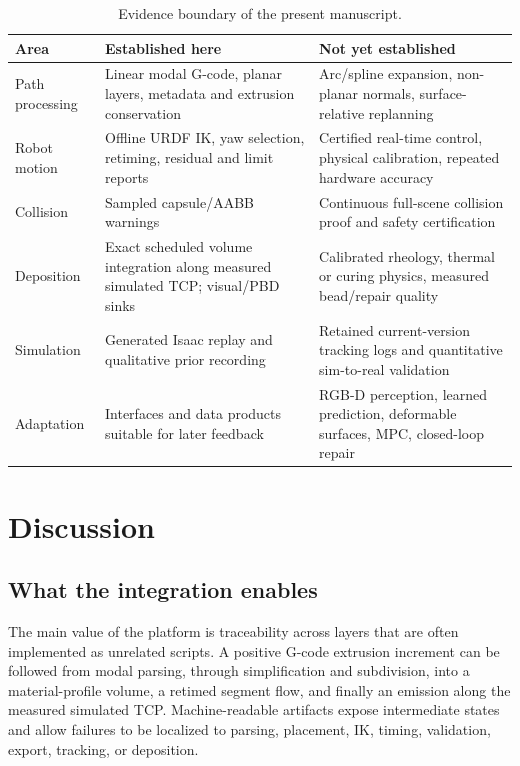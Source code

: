 \documentclass[letterpaper,10pt,conference]{ieeeconf}
\begin{document}
\begin{table}[!t]
\centering
\caption{Evidence boundary of the present manuscript.}
\label{tab:evidence}
\footnotesize
\begin{tabularx}{\textwidth}{@{}>{\raggedright\arraybackslash}p{}
  >{\raggedright\arraybackslash}X>{\raggedright\arraybackslash}X@{}}
\toprule
Area & Established here & Not yet established \\
\midrule
Path processing & Linear modal G-code, planar layers, metadata and extrusion conservation & Arc/spline expansion, non-planar normals, surface-relative replanning \\
Robot motion & Offline URDF IK, yaw selection, retiming, residual and limit reports & Certified real-time control, physical calibration, repeated hardware accuracy \\
Collision & Sampled capsule/AABB warnings & Continuous full-scene collision proof and safety certification \\
Deposition & Exact scheduled volume integration along measured simulated TCP; visual/PBD sinks & Calibrated rheology, thermal or curing physics, measured bead/repair quality \\
Simulation & Generated Isaac replay and qualitative prior recording & Retained current-version tracking logs and quantitative sim-to-real validation \\
Adaptation & Interfaces and data products suitable for later feedback & RGB-D perception, learned prediction, deformable surfaces, MPC, closed-loop repair \\
\bottomrule
\end{tabularx}
\end{table}

\section{Discussion}

\subsection{What the integration enables}

The main value of the platform is traceability across layers that are often
implemented as unrelated scripts.  A positive G-code extrusion increment can
be followed from modal parsing, through simplification and subdivision, into a
material-profile volume, a retimed segment flow, and finally an emission along
the measured simulated TCP.  Machine-readable artifacts expose intermediate
states and allow failures to be localized to parsing, placement, IK, timing,
validation, export, tracking, or deposition.
\end{document}
